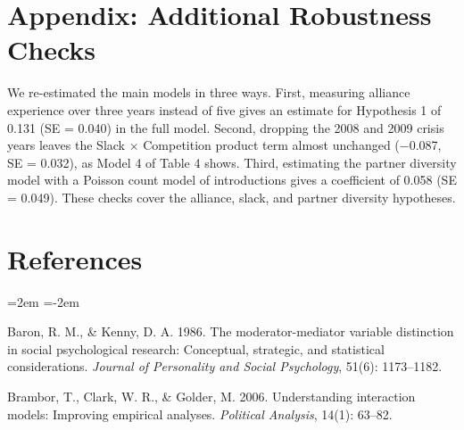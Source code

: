 \documentclass[12pt]{article}
\begin{document}
\section*{Appendix: Additional Robustness Checks}

We re-estimated the main models in three ways. First, measuring alliance experience over three years instead of five gives an estimate for Hypothesis 1 of 0.131 (SE = 0.040) in the full model. Second, dropping the 2008 and 2009 crisis years leaves the Slack $\times$ Competition product term almost unchanged ($-$0.087, SE = 0.032), as Model 4 of Table 4 shows. Third, estimating the partner diversity model with a Poisson count model of introductions gives a coefficient of 0.058 (SE = 0.049). These checks cover the alliance, slack, and partner diversity hypotheses.

\section*{References}

\begin{list}{}{\leftmargin=2em \itemindent=-2em \itemsep=2pt}
\item Baron, R. M., \& Kenny, D. A. 1986. The moderator-mediator variable distinction in social psychological research: Conceptual, strategic, and statistical considerations. \textit{Journal of Personality and Social Psychology}, 51(6): 1173--1182.
\item Brambor, T., Clark, W. R., \& Golder, M. 2006. Understanding interaction models: Improving empirical analyses. \textit{Political Analysis}, 14(1): 63--82.
\end{list}
\end{document}
